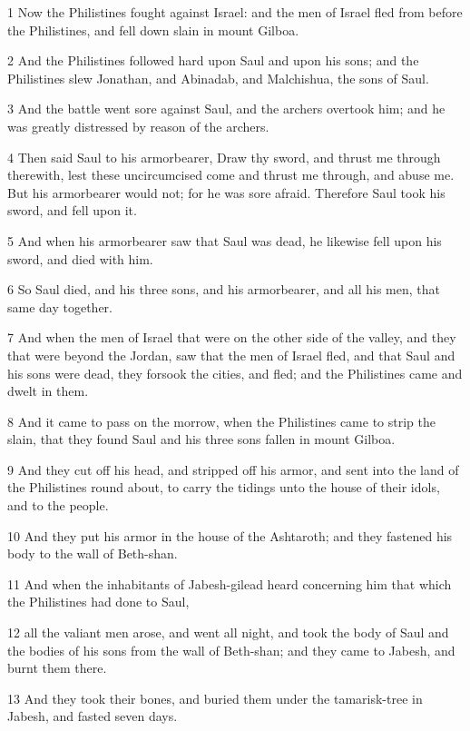 \par 1 Now the Philistines fought against Israel: and the men of Israel fled from before the Philistines, and fell down slain in mount Gilboa.
\par 2 And the Philistines followed hard upon Saul and upon his sons; and the Philistines slew Jonathan, and Abinadab, and Malchishua, the sons of Saul.
\par 3 And the battle went sore against Saul, and the archers overtook him; and he was greatly distressed by reason of the archers.
\par 4 Then said Saul to his armorbearer, Draw thy sword, and thrust me through therewith, lest these uncircumcised come and thrust me through, and abuse me. But his armorbearer would not; for he was sore afraid. Therefore Saul took his sword, and fell upon it.
\par 5 And when his armorbearer saw that Saul was dead, he likewise fell upon his sword, and died with him.
\par 6 So Saul died, and his three sons, and his armorbearer, and all his men, that same day together.
\par 7 And when the men of Israel that were on the other side of the valley, and they that were beyond the Jordan, saw that the men of Israel fled, and that Saul and his sons were dead, they forsook the cities, and fled; and the Philistines came and dwelt in them.
\par 8 And it came to pass on the morrow, when the Philistines came to strip the slain, that they found Saul and his three sons fallen in mount Gilboa.
\par 9 And they cut off his head, and stripped off his armor, and sent into the land of the Philistines round about, to carry the tidings unto the house of their idols, and to the people.
\par 10 And they put his armor in the house of the Ashtaroth; and they fastened his body to the wall of Beth-shan.
\par 11 And when the inhabitants of Jabesh-gilead heard concerning him that which the Philistines had done to Saul,
\par 12 all the valiant men arose, and went all night, and took the body of Saul and the bodies of his sons from the wall of Beth-shan; and they came to Jabesh, and burnt them there.
\par 13 And they took their bones, and buried them under the tamarisk-tree in Jabesh, and fasted seven days.

